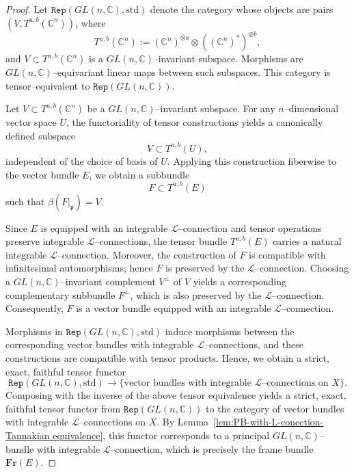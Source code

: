 \documentclass[12pt,reqno]{amsart}
\numberwithin{equation}{subsection}
\theoremstyle{definition}
\theoremstyle{theorem}
\begin{document}
\begin{proof}
	Let $\texttt{Rep}(GL(n,\mathbb{C}),\mathrm{std})$ denote the category whose
	objects are pairs $(V,T^{a,b}(\mathbb{C}^{n}))$, where
	\[
	T^{a,b}(\mathbb{C}^{n})
	:= (\mathbb{C}^{n})^{\otimes a} \otimes ((\mathbb{C}^{n})^{*})^{\otimes b},
	\]
	and $V \subset T^{a,b}(\mathbb{C}^{n})$ is a $GL(n,\mathbb{C})$--invariant
	subspace. Morphisms are $GL(n,\mathbb{C})$--equivariant linear maps between such
	subspaces. This category is tensor--equivalent to
	$\texttt{Rep}(GL(n,\mathbb{C}))$.
	
	Let $V \subset T^{a,b}(\mathbb{C}^{n})$ be a $GL(n,\mathbb{C})$--invariant
	subspace. For any $n$--dimensional vector space $U$, the functoriality of tensor
	constructions yields a canonically defined subspace
	\[
	V \subset T^{a,b}(U),
	\]
	independent of the choice of basis of $U$.
	Applying this construction fiberwise to the vector bundle $E$, we obtain a
	subbundle
	\[
	F \subset T^{a,b}(E)
	\]
	such that $\beta(F|_{\mathfrak{p}}) = V$.
	
	Since $E$ is equipped with an integrable $\mathcal{L}$--connection and tensor
	operations preserve integrable $\mathcal{L}$--connections, the tensor bundle
	$T^{a,b}(E)$ carries a natural integrable $\mathcal{L}$--connection. Moreover,
	the construction of $F$ is compatible with infinitesimal automorphisms; hence
	$F$ is preserved by the $\mathcal{L}$--connection. Choosing a
	$GL(n,\mathbb{C})$--invariant complement $V^{\perp}$ of $V$ yields a
	corresponding complementary subbundle $F^{\perp}$, which is also preserved by
	the $\mathcal{L}$--connection. Consequently, $F$ is a vector bundle equipped
	with an integrable $\mathcal{L}$--connection.
	
	Morphisms in $\texttt{Rep}(GL(n,\mathbb{C}),\mathrm{std})$ induce morphisms
	between the corresponding vector bundles with integrable
	$\mathcal{L}$--connections, and these constructions are compatible with tensor
	products. Hence, we obtain a strict, exact, faithful tensor functor
	\[
	\texttt{Rep}(GL(n,\mathbb{C}),\mathrm{std})
	\longrightarrow
	\{\text{vector bundles with integrable $\mathcal{L}$--connections on } X\}.
	\]
	Composing with the inverse of the above tensor equivalence yields a strict,
	exact, faithful tensor functor from
	$\texttt{Rep}(GL(n,\mathbb{C}))$ to the category of vector bundles with
	integrable $\mathcal{L}$--connections on $X$. By
	Lemma~\eqref{lem:PB-with-L-conection-Tannakian equivalence}, this functor
	corresponds to a principal $GL(n,\mathbb{C})$--bundle with integrable
	$\mathcal{L}$--connection, which is precisely the frame bundle $\mathbf{Fr}(E)$.
\end{proof}
\end{document}
